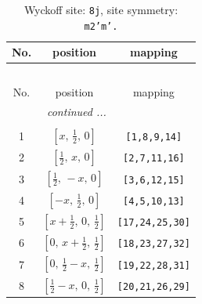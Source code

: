 \documentclass[fleqn,8pt]{jsarticle}
\begin{document}
\begin{longtable}{ccc}
\caption{Wyckoff site: {\tt 8j}, site symmetry: {\tt m2'm'.}}
 \\
 \hline \hline
No. & position & mapping \\ \hline \endfirsthead

\multicolumn{2}{l}{\tablename\ \thetable{}} \\
 \hline \hline
No. & position & mapping \\ \hline \endhead

 \hline \hline
\multicolumn{2}{r}{\footnotesize\it continued ...} \\ \endfoot

 \hline \hline
\multicolumn{2}{r}{} \\ \endlastfoot

1 & $\left[ x,\, \frac{1}{2},\, 0 \right]$ & {\tt [1,8,9,14]} \\ \hline
2 & $\left[ \frac{1}{2},\, x,\, 0 \right]$ & {\tt [2,7,11,16]} \\ \hline
3 & $\left[ \frac{1}{2},\, - x,\, 0 \right]$ & {\tt [3,6,12,15]} \\ \hline
4 & $\left[ - x,\, \frac{1}{2},\, 0 \right]$ & {\tt [4,5,10,13]} \\ \hline
5 & $\left[ x + \frac{1}{2},\, 0,\, \frac{1}{2} \right]$ & {\tt [17,24,25,30]} \\ \hline
6 & $\left[ 0,\, x + \frac{1}{2},\, \frac{1}{2} \right]$ & {\tt [18,23,27,32]} \\ \hline
7 & $\left[ 0,\, \frac{1}{2} - x,\, \frac{1}{2} \right]$ & {\tt [19,22,28,31]} \\ \hline
8 & $\left[ \frac{1}{2} - x,\, 0,\, \frac{1}{2} \right]$ & {\tt [20,21,26,29]} \\
\end{longtable}
\renewcommand{\arraystretch}{1.2}
\end{document}
